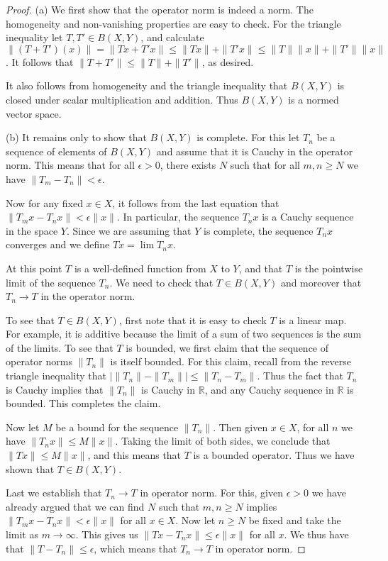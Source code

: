 \documentclass[11pt,oneside]{amsbook}
\newcommand{\RR}{{\mathbb R}}
\theoremstyle{definition}
\theoremstyle{plain}
\theoremstyle{definition}
\theoremstyle{remark}
\numberwithin{equation}{section}
\numberwithin{figure}{section}
\begin{document}
\begin{proof}
  (a) We first show that the operator norm is indeed a norm. The homogeneity and non-vanishing properties are easy to check. For the triangle inequality let $T,T'\in B(X,Y)$, and calculate $\|(T+T')(x)\|=\|Tx+T'x\|\leq\|Tx\|+\|T'x\|\leq\|T\|\|x\|+\|T'\|\|x\|$. It follows that $\|T+T'\|\leq\|T\|+\|T'\|$, as desired.

  It also follows from homogeneity and the triangle inequality that $B(X,Y)$ is closed under scalar multiplication and addition. Thus $B(X,Y)$ is a normed vector space.
  
  (b) It remains only to show that $B(X,Y)$ is complete. For this let $T_n$ be a sequence of elements of $B(X,Y)$ and assume that it is Cauchy in the operator norm. This means that for all $\epsilon>0$, there exists $N$ such that for all $m,n\geq N$ we have $\|T_m-T_n\|<\epsilon$.

  Now for any fixed $x\in X$, it follows from the last equation that $\|T_mx-T_nx\|<\epsilon\|x\|$. In particular, the sequence $T_nx$ is a Cauchy sequence in the space $Y$. Since we are assuming that $Y$ is complete, the sequence $T_nx$ converges and we define $Tx=\lim T_nx$.

  At this point $T$ is a well-defined function from $X$ to $Y$, and that $T$ is the pointwise limit of the sequence $T_n$. We need to check that $T\in B(X,Y)$ and moreover that $T_n\to T$ in the operator norm.

  To see that $T\in B(X,Y)$, first note that it is easy to check $T$ is a linear map. For example, it is additive because the limit of a sum of two sequences is the sum of the limits. To see that $T$ is bounded, we first claim that the sequence of operator norms $\|T_n\|$ is itself bounded. For this claim, recall from the reverse triangle inequality that $|\|T_n\|-\|T_m\||\leq\|T_n-T_m\|$. Thus the fact that $T_n$ is Cauchy implies that $\|T_n\|$ is Cauchy in $\RR$, and any Cauchy sequence in $\RR$ is bounded. This completes the claim.
  
  Now let $M$ be a bound for the sequence $\|T_n\|$. Then given $x\in X$, for all $n$ we have $\|T_nx\|\leq M\|x\|$. Taking the limit of both sides, we conclude that $\|Tx\|\leq M\|x\|$, and this means that $T$ is a bounded operator. Thus we have shown that $T\in B(X,Y)$.

  Last we establish that $T_n\to T$ in operator norm. For this, given $\epsilon>0$ we have already argued that we can find $N$ such that $m,n\geq N$ implies $\|T_mx-T_nx\|<\epsilon\|x\|$ for all $x\in X$. Now let $n\geq N$ be fixed and take the limit as $m\to\infty$. This gives us $\|Tx-T_nx\|\leq\epsilon\|x\|$ for all $x$. We thus have that $\|T-T_n\|\leq\epsilon$, which means that $T_n\to T$ in operator norm.
\end{proof}
\end{document}
